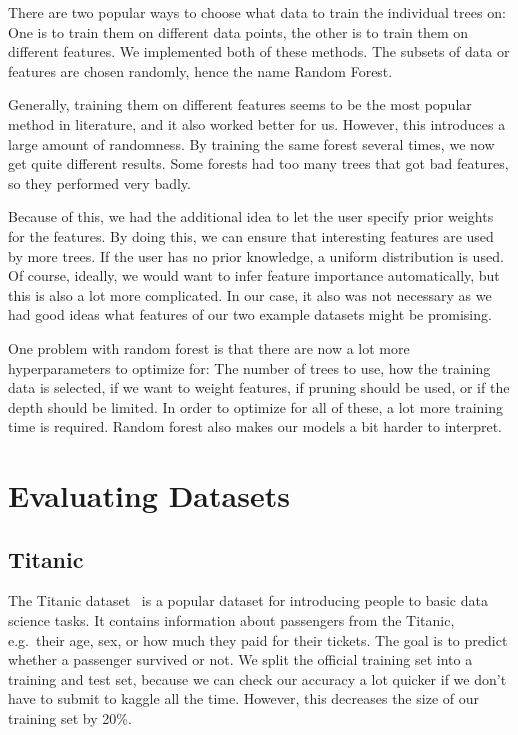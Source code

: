\documentclass[a4paper]{article}
\begin{document}
There are two popular ways to choose what data to train the individual trees on: One is to train them on different data points, the other is to train them on different features. We implemented both of these methods. The subsets of data or features are chosen randomly, hence the name Random Forest.

Generally, training them on different features seems to be the most popular method in literature, and it also worked better for us. However, this introduces a large amount of randomness. By training the same forest several times, we now get quite different results. Some forests had too many trees that got bad features, so they performed very badly.

Because of this, we had the additional idea to let the user specify prior weights for the features. By doing this, we can ensure that interesting features are used by more trees. If the user has no prior knowledge, a uniform distribution is used. Of course, ideally, we would want to infer feature importance automatically, but this is also a lot more complicated. In our case, it also was not necessary as we had good ideas what features of our two example datasets might be promising.

One problem with random forest is that there are now a lot more hyperparameters to optimize for: The number of trees to use, how the training data is selected, if we want to weight features, if pruning should be used, or if the depth should be limited. In order to optimize for all of these, a lot more training time is required. Random forest also makes our models a bit harder to interpret.

\section{Evaluating Datasets}

\subsection{Titanic}

The Titanic dataset~\cite{titanic} is a popular dataset for introducing people to basic data science tasks. It contains information about passengers from the Titanic, e.g.\  their age, sex, or how much they paid for their tickets. The goal is to predict whether a passenger survived or not. We split the official training set into a training and test set, because we can check our accuracy a lot quicker if we don't have to submit to kaggle all the time. However, this decreases the size of our training set by 20\%.
\end{document}
